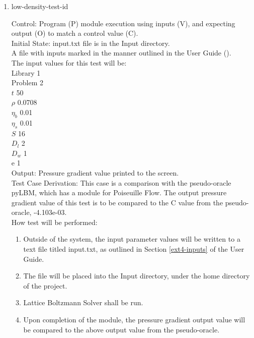 \documentclass[12pt, titlepage]{article}
\newcommand{\famname}{Lattice Boltzmann Solver}
\newcounter{testcounter} %
\begin{document}
\begin{enumerate}
\item{low-density-test-id\thetestcounter \\}

Control: Program (P) module execution using inputs (V), and expecting output (O) to match a control value (C).\\
					
Initial State: input.txt file is in the Input directory.\\
					
A file with inputs marked in the manner outlined in the User
Guide (\citet{LBM_UserGuide_PM}).\\The input values for this test will be:\\
Library 1\\
Problem 2\\
$t$ 50\\
$\rho$ 0.0708\\
$\eta_b$ 0.01\\
$\eta_s$ 0.01\\
$S$ 16\\
$D_{l}$ 2\\
$D_{w}$ 1\\
$\mathrm{e}$ 1\\

					
Output: Pressure gradient value printed to the screen. \\ 

Test Case Derivation: This case is a comparison with the pseudo-oracle pyLBM,
which has a module for Poiseuille Flow. The output pressure gradient value of
this test is to be compared to the C value from the pseudo-oracle,
-4.103e-03.\\
					
How test will be performed: 

\begin{enumerate}
\item Outside of the system, the input parameter values will be written to a text file titled input.txt, as outlined in Section \ref{ext4-inputs} of the User Guide.
\item The file will be placed into the Input directory, under the home directory
of the project.
\item {\famname} shall be run.
\item Upon completion of the module, the pressure gradient output value will be
compared to the above output value from the pseudo-oracle.
\end{enumerate}	


\end{enumerate}
\end{document}
